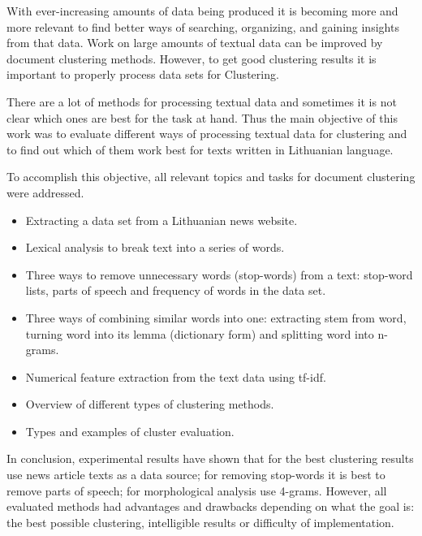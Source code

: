 \documentclass{VUMIFInfBakalaurinis}
\begin{document}

With ever-increasing amounts of data being produced it is becoming more and more
relevant to find better ways of searching, organizing, and gaining insights from
that data. Work on large amounts of textual data can be improved by document
clustering methods. However, to get good clustering results it is important
to properly process data sets for Clustering.

There are a lot of methods for processing textual data and sometimes it is not
clear which ones are best for the task at hand. Thus the main objective of this
work was to evaluate different ways of processing textual data for clustering and
to find out which of them work best for texts written in Lithuanian language.

To accomplish this objective, all relevant topics and tasks for document clustering were addressed.

\begin{itemize}
  \item
    Extracting a data set from a Lithuanian news website.
  \item
    Lexical analysis to break text into a series of words.
  \item
    Three ways to remove unnecessary words (stop-words) from a text: stop-word lists, parts of speech and frequency of words in the data set.
  \item
    Three ways of combining similar words into one: extracting stem from word, turning word into its lemma (dictionary form) and splitting word into n-grams.
  \item
    Numerical feature extraction from the text data using tf-idf.
  \item
    Overview of different types of clustering methods.
  \item 
    Types and examples of cluster evaluation.
\end{itemize}

In conclusion, experimental results have shown that for the best clustering results
use news article texts as a data source; for removing stop-words it is best to remove
parts of speech; for morphological analysis use 4-grams. However, all evaluated
methods had advantages and drawbacks depending on what the goal is: the best possible
clustering, intelligible results or difficulty of implementation.


\printbibliography[heading=bibintoc] %
\end{document}
